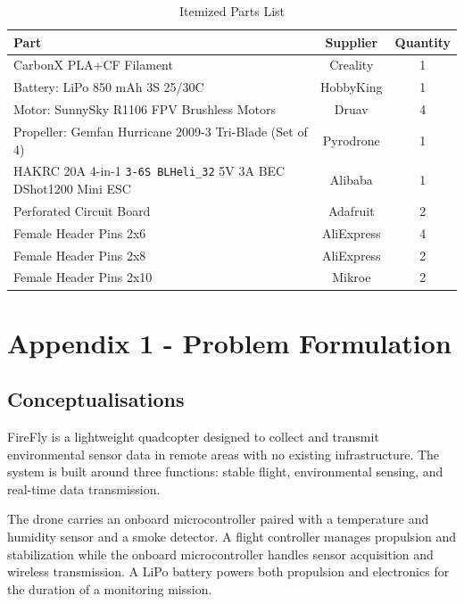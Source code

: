 \documentclass[journal, onecolumn]{IEEEtran}
\begin{document}
\begin{table}[H]
    \centering
    \small
    \begin{tabular}{|l|c|c|}
        \hline
        \textbf{Part} & \textbf{Supplier} & \textbf{Quantity} \\
        \hline
        CarbonX PLA+CF Filament & Creality & 1 \\
        \hline
        Battery: LiPo 850 mAh 3S 25/30C & HobbyKing & 1 \\
        \hline
        Motor: SunnySky R1106 FPV Brushless Motors & Druav & 4 \\
        \hline
        Propeller: Gemfan Hurricane 2009-3 Tri-Blade (Set of 4) & Pyrodrone & 1 \\
        \hline
        HAKRC 20A 4-in-1 \verb|3-6S BLHeli_32| 5V 3A BEC DShot1200 Mini ESC & Alibaba & 1 \\
        \hline
        Perforated Circuit Board & Adafruit & 2 \\
        \hline
        Female Header Pins 2x6 & AliExpress & 4 \\
        \hline
        Female Header Pins 2x8 & AliExpress & 2 \\
        \hline
        Female Header Pins 2x10 & Mikroe & 2 \\
        \hline
    \end{tabular}
    \caption{Itemized Parts List}
    \label{tab:budget}
\end{table}

\newpage

\section{Appendix 1 - Problem Formulation}

\subsection{Conceptualisations}

FireFly is a lightweight quadcopter designed to collect and transmit
environmental sensor data in remote areas with no existing infrastructure.
The system is built around three functions: stable flight, environmental
sensing, and real-time data transmission.

\vspace{0.5em}

The drone carries an onboard microcontroller paired with a temperature and humidity sensor and a smoke detector. A flight controller manages propulsion and stabilization while the onboard microcontroller handles sensor acquisition and wireless transmission. A LiPo battery powers both propulsion and electronics for the duration of a monitoring mission.
\end{document}
